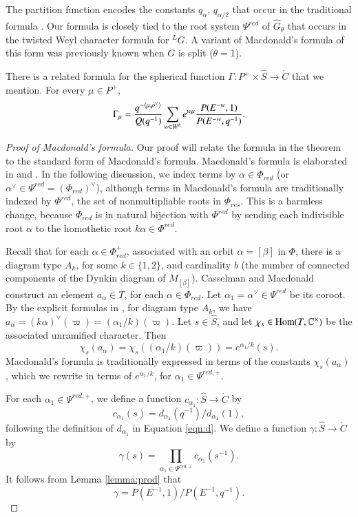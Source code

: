 The partition function encodes the constants $q_\alpha$,
$q_{\alpha/2}$ that occur in the traditional formula
\cite{macdonaldspherical}.  Our formula is closely tied to the root
system $\Psi^{red}$ of $\hat G_\theta$ that occurs in the twisted Weyl
character formula for ${}^LG$.  A variant of Macdonald's formula of
this form was previously known when $G$ is split ($\theta=1$).

There is a related formula for the spherical function
$\Gamma:P^+\times\hat S\to\ring{C}$ that we mention.  For every
$\mu\in P^+$,
\begin{equation} 
\Gamma_\mu = 
\frac{q^{-\langle{\mu,\rho^\vee}\rangle}}{ Q(q^{-1})} 
\sum_{w\in W^\theta} e^{w\mu} \frac{P(E^{-w},1)}{P(E^{-w},q^{-1})}.
\end{equation}

\begin{proof}[Proof of Macdonald's formula]
  Our proof will relate the formula in the theorem to the standard
  form of Macdonald's formula.  Macdonald's formula is elaborated in
  \cite{casselman1980unramified} and \cite{casselman2005companion}.
  In the following discussion, we index terms by
  $\alpha\in\Phi_{red}$ (or $\alpha^\vee\in \Psi^{red} =
  (\Phi_{red})^\vee$), although terms in Macdonald's formula are
  traditionally indexed by $\Phi^{red}$, the set of nonmultipliable
  roots in $\Phi_{res}$.  This is a harmless change, because
  $\Phi_{red}$ is in natural bijection with $\Phi^{red}$ by
  sending each indivisible root $\alpha$ to the homothetic root
  $k\alpha\in\Phi^{red}$.

  Recall that for each $\alpha\in \Phi^+_{red}$, associated with an
  orbit $\alpha=[\beta]$ in $\Phi$, there is a diagram type $A_k$, for
  some $k\in\{1,2\}$, and cardinality $b$ (the number of connected
  components of the Dynkin diagram of $M_{[\beta]}$).  Casselman and
  Macdonald construct an element $a_{\alpha}\in T$, for each
  $\alpha\in\Phi_{red}$.  Let $\alpha_1 = \alpha^\vee\in \Psi^{red}$
  be its coroot.  By the explicit formulas in
  \cite{casselman2005companion}, for diagram type $A_k$, we have
  $a_\alpha = (k\alpha)^\vee(\varpi) = (\alpha_1/k)(\varpi)$.  Let
  $s\in \hat S$, and let $\chi_s\in{\operatorname{Hom}}(T,\mathbb{C}^\times)$ be the
  associated unramified character.  Then
\[
\chi_s(a_{\alpha}) = \chi_s((\alpha_1/k)(\varpi)) = e^{\alpha_1/k}(s).
\]
Macdonald's formula is traditionally expressed in terms of the
constants $\chi_s(a_\alpha)$, which we rewrite in terms of
$e^{\alpha_1/k}$, for $\alpha_1\in\Psi^{red,+}$.

For each $\alpha_1\in\Psi^{red,+}$, we define a function
$c_{\alpha_1}:\hat S\to\ring{C}$ by
\[
c_{\alpha_1}(s) = d_{\alpha_1}(q^{-1})/d_{\alpha_1}(1),
\]
following the definition of $d_{\alpha_1}$ in Equation \ref{eqn:d}.
We define a function $\gamma:\hat S\to \ring{C}$ by
\[
\gamma(s)  = \prod_{\alpha_1\in \Psi^{red,+}} c_{\alpha_1}(s^{-1}).
\]
It follows from Lemma \ref{lemma:prod} that
\begin{equation}\label{eqn:gamma}
\gamma = P(E^{-1},1)/P(E^{-1},q^{-1}).
\end{equation}


\end{proof}
